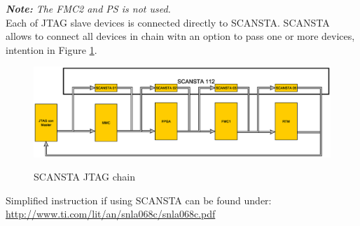 	\textit{\textbf{Note:} The FMC2 and PS is not used.}\\


Each of JTAG slave devices is connected directly to SCANSTA. SCANSTA allows to connect all devices in chain witn an option to pass one or more devices, intention in Figure \ref{jtagchain}.

		\begin{figure}[htbp!]
			\centering
			\includegraphics[scale=0.4]{img/jtagchain.eps}\\
			\caption{SCANSTA JTAG chain} \label{jtagchain}
		\end{figure}
		
		
Simplified instruction if using SCANSTA can be found under: \href{http://www.ti.com/lit/an/snla068c/snla068c.pdf}{http://www.ti.com/lit/an/snla068c/snla068c.pdf} 
